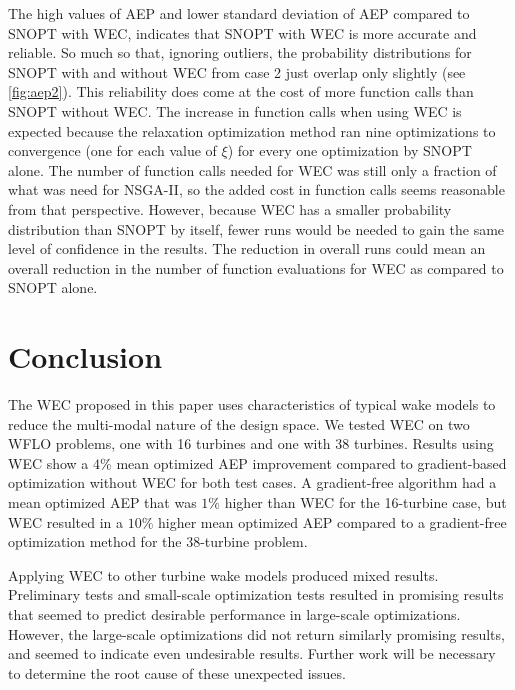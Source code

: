 \documentclass[a4paper]{jpconf}
\begin{document}
The high values of AEP and lower standard deviation of AEP compared to SNOPT with WEC, indicates that SNOPT with WEC is more accurate and reliable. So much so that, ignoring outliers, the probability distributions for SNOPT with and without WEC from case 2 just overlap only slightly (see \cref{fig:aep2}). This reliability does come at the cost of more function calls than SNOPT without WEC. The increase in function calls when using WEC is expected because the relaxation optimization method ran nine optimizations to convergence (one for each value of $\xi$) for every one optimization by SNOPT alone. The number of function calls needed for WEC was still only a fraction of what was need for NSGA-II, so the added cost in function calls seems reasonable from that perspective. However, because WEC has a smaller probability distribution than SNOPT by itself, fewer runs would be needed to gain the same level of confidence in the results. The reduction in overall runs could mean an overall reduction in the number of function evaluations for WEC as compared to SNOPT alone.

\section{Conclusion}
The WEC proposed in this paper uses characteristics of typical wake models to reduce the multi-modal nature of the design space. We tested WEC on two WFLO problems, one with 16 turbines and one with 38 turbines. Results using WEC show a $4\%$ mean optimized AEP improvement compared to gradient-based optimization without WEC for both test cases. A gradient-free algorithm had a mean optimized AEP that was $1\%$ higher than WEC for the 16-turbine case, but WEC resulted in a $10\%$ higher mean optimized AEP compared to a gradient-free optimization method for the 38-turbine problem.

Applying WEC to other turbine wake models produced mixed results. Preliminary tests and small-scale optimization tests resulted in promising results that seemed to predict desirable performance in large-scale optimizations. However, the large-scale optimizations did not return similarly promising results, and seemed to indicate even undesirable results. Further work will be necessary to determine the root cause of these unexpected issues.

\end{document}
